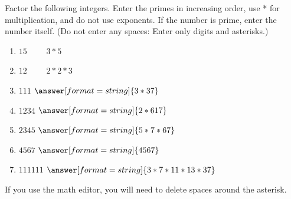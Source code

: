 \documentclass[nooutcomes]{ximera}
\begin{document}


%



\begin{problem}
Factor the following integers.  Enter the primes in increasing order, use * for multiplication, and do not use exponents.  If the number is prime, enter the number itself.  (Do not enter any spaces: Enter only digits and asterisks.)
\begin{enumerate}
\item $15\qquad$ $3*5$
\item $12\qquad$ $2*2*3$
\item $111$     $\answer[format=string]{3*37}$
\item $1234$    $\answer[format=string]{2*617}$
\item $2345$    $\answer[format=string]{5*7*67}$
\item $4567$    $\answer[format=string]{4567}$
\item $111111$  $\answer[format=string]{3*7*11*13*37}$
\end{enumerate}
\begin{hint}
If you use the math editor, you will need to delete spaces around the asterisk. 
\end{hint}
\end{problem}
\end{document}
